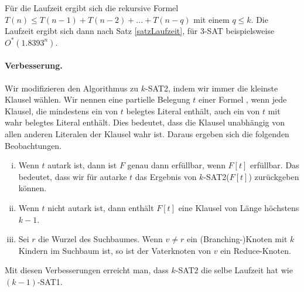   Für die Laufzeit ergibt sich die rekursive Formel \(T(n) \leq T(n-1) + T(n-2) + ... + T(n-q)\) mit einem \(q \leq k\). Die Laufzeit ergibt sich dann nach Satz \ref{satzLaufzeit}, für \(3\)-SAT beispielsweise \(O^*(1.8393^n)\).

  \paragraph{Verbesserung.} Wir modifizieren den Algorithmus zu \(k\)-SAT2, indem wir immer die kleinste Klausel wählen. Wir nennen eine partielle Belegung \(t\) einer Formel , wenn jede Klausel, die mindestens ein von \(t\) belegtes Literal enthält, auch ein von \(t\) mit wahr belegtes Literal enthält. Dies bedeutet, dass die Klausel unabhängig von allen anderen Literalen der Klausel wahr ist. Daraus ergeben sich die folgenden Beobachtungen.
  \begin{enumerate}[(i)]
   \item Wenn \(t\) autark ist, dann ist \(F\) genau dann erfüllbar, wenn \(F[t]\) erfüllbar. Das bedeutet, dass wir für autarke \(t\) das Ergebnis von \(k\)-SAT2(\(F[t]\)) zurückgeben können.
   \item Wenn \(t\) nicht autark ist, dann enthält \(F[t]\) eine Klausel von Länge höchstens \(k-1\).
   \item Sei \(r\) die Wurzel des Suchbaumes. Wenn \(v \neq r\) ein (Branching-)Knoten mit \(k\) Kindern im Suchbaum ist, so ist der Vaterknoten von \(v\) ein Reduce-Knoten.
  \end{enumerate}
  Mit diesen Verbesserungen erreicht man, dass \(k\)-SAT2 die selbe Laufzeit hat wie \((k-1)\)-SAT1.

  